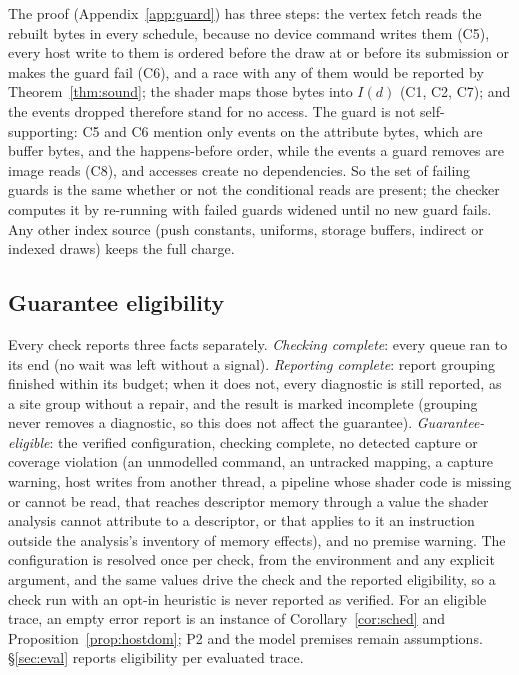 The proof (Appendix~\ref{app:guard}) has three steps: the vertex fetch reads the rebuilt bytes in every schedule,
because no device command writes them (C5), every host write to them is ordered before the draw at or before its
submission or makes the guard fail (C6), and a race with any of them would be reported by Theorem~\ref{thm:sound}; the
shader maps those bytes into $I(d)$ (C1, C2, C7); and the events dropped therefore stand for no access. The guard is
not self-supporting: C5 and C6 mention only events on the attribute bytes, which are buffer bytes, and the
happens-before order, while the events a guard removes are image reads (C8), and accesses create no dependencies. So
the set of failing guards is the same whether or not the conditional reads are present; the checker computes it by
re-running with failed guards widened until no new guard fails. Any other index source (push constants, uniforms,
storage buffers, indirect or indexed draws) keeps the full charge.

\subsection{Guarantee eligibility}
\label{sec:eligible}
Every check reports three facts separately. \emph{Checking complete}: every queue ran to its end (no wait was left
without a signal). \emph{Reporting complete}: report grouping finished within its budget; when it does not, every
diagnostic is still reported, as a site group without a repair, and the result is marked incomplete (grouping never
removes a diagnostic, so this does not affect the guarantee). \emph{Guarantee-eligible}: the verified configuration,
checking complete, no detected capture or coverage violation (an unmodelled command, an untracked mapping, a capture
warning, host writes from another thread, a pipeline whose shader code is missing or cannot be read, that reaches
descriptor memory through a value the shader analysis cannot attribute to a descriptor, or that applies to it an
instruction outside the analysis's inventory of memory effects), and no premise
warning. The configuration is resolved once per check, from the environment and any explicit argument, and the
same values drive the check and the reported eligibility, so a check run with an opt-in heuristic is never reported
as verified. For an eligible trace, an empty error report is an
instance of Corollary~\ref{cor:sched} and Proposition~\ref{prop:hostdom}; P2 and the model premises remain assumptions.
\S\ref{sec:eval} reports eligibility per evaluated trace.

